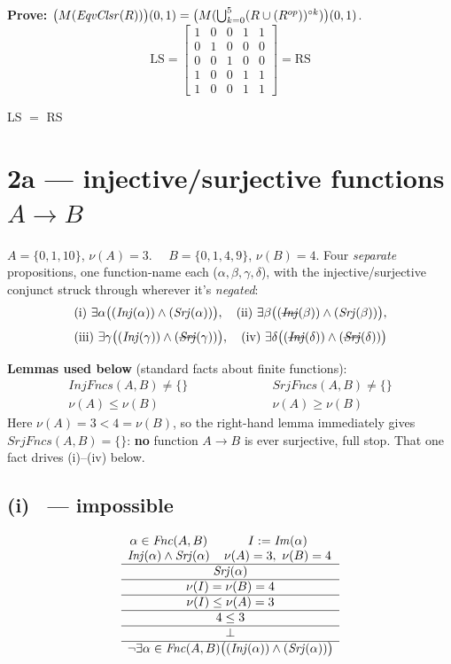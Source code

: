 \documentclass[11pt]{article}
\newcommand{\op}[1]{\mathit{#1}}
\newcommand{\Fnc}{\op{Fnc}} \newcommand{\Inj}{\op{Inj}} \newcommand{\Srj}{\op{Srj}}
\newcommand{\InjFncs}{\op{InjFncs}} \newcommand{\SrjFncs}{\op{SrjFncs}}
\newcommand{\seclabel}[1]{\noindent\fbox{\textbf{#1}}\par\smallskip}
\begin{document}
\noindent\textbf{Prove:} $\big(M(\EqvClsr(R))\big)(0,1) = \big(M(\bigcup_{k=0}^5(R\cup(R^{op}))^{\circ k})\big)(0,1)$.
\[
\text{LS}=\begin{bmatrix}1&0&0&1&1\\0&1&0&0&0\\0&0&1&0&0\\1&0&0&1&1\\1&0&0&1&1\end{bmatrix}=\text{RS}
\]
\centerline{LS $=$ RS}

\clearpage
\section*{2a --- injective/surjective functions $A\to B$}
$A=\{0,1,10\}$, $\nu(A)=3$. $\quad B=\{0,1,4,9\}$, $\nu(B)=4$. Four \emph{separate} propositions, one function-name each ($\alpha,\beta,\gamma,\delta$), with the injective/surjective conjunct struck through wherever it's \emph{negated}:
\[
\text{(i) }\exists\alpha\big((\Inj(\alpha))\wedge(\Srj(\alpha))\big),\quad
\text{(ii) }\exists\beta\big((\text{\sout{\textit{Inj}}}(\beta))\wedge(\Srj(\beta))\big),
\]
\[
\text{(iii) }\exists\gamma\big((\Inj(\gamma))\wedge(\text{\sout{\textit{Srj}}}(\gamma))\big),\quad
\text{(iv) }\exists\delta\big((\text{\sout{\textit{Inj}}}(\delta))\wedge(\text{\sout{\textit{Srj}}}(\delta))\big)
\]

\seclabel{2a.0}
\noindent\textbf{Lemmas used below} (standard facts about finite functions):
\[
\begin{array}{c}
\InjFncs(A,B)\ne\{\}\\
\hline\hline
\nu(A)\le\nu(B)
\end{array}
\qquad\qquad\qquad
\begin{array}{c}
\SrjFncs(A,B)\ne\{\}\\
\hline\hline
\nu(A)\ge\nu(B)
\end{array}
\]
Here $\nu(A)=3<4=\nu(B)$, so the right-hand lemma immediately gives $\SrjFncs(A,B)=\{\}$: \textbf{no} function $A\to B$ is ever surjective, full stop. That one fact drives (i)--(iv) below.

\subsection*{(i) \circn\ --- impossible}
\seclabel{2a.i}
\[
\begin{array}{cc}
\alpha\in\Fnc(A,B) & I:=\Img(\alpha)\\
\Inj(\alpha)\wedge\Srj(\alpha) & \nu(A)=3,\ \nu(B)=4\\
\hline
\multicolumn{2}{c}{\Srj(\alpha)}\\
\hline
\multicolumn{2}{c}{\nu(I)=\nu(B)=4}\\
\hline
\multicolumn{2}{c}{\nu(I)\le\nu(A)=3}\\
\hline
\multicolumn{2}{c}{4\le3}\\
\hline
\multicolumn{2}{c}{\bot}\\
\hline
\multicolumn{2}{c}{\neg\exists\alpha\in\Fnc(A,B)\big((\Inj(\alpha))\wedge(\Srj(\alpha))\big)}
\end{array}
\]
\end{document}

